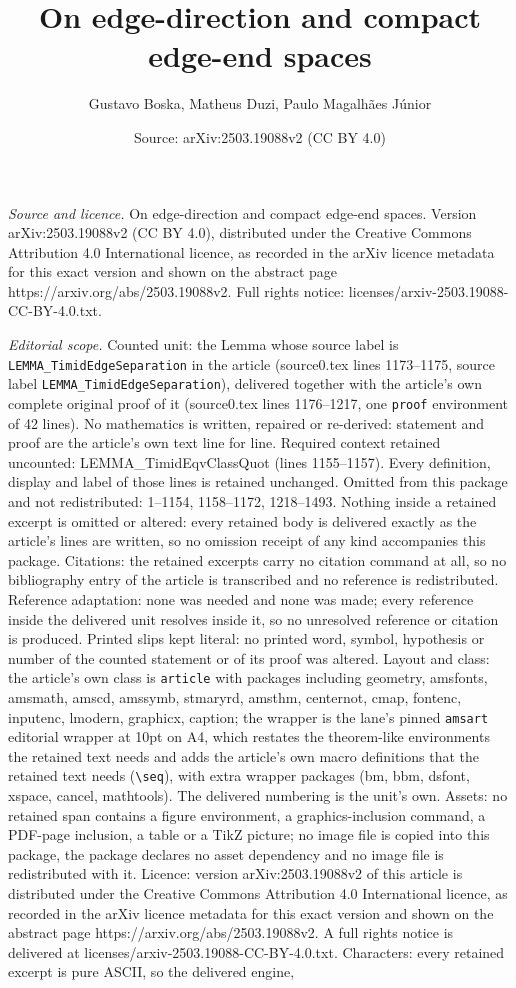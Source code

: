 \documentclass[10pt,a4paper]{amsart}
\title[On edge-direction and compact edge-end spaces]{On edge-direction and compact edge-end spaces}
\author{Gustavo Boska, Matheus Duzi, Paulo Magalh\~aes J\'unior}
\date{Source: arXiv:2503.19088v2 (CC BY 4.0)}
\begin{document}
\maketitle

\noindent\emph{Source and licence.} On edge-direction and compact edge-end spaces. Version arXiv:2503.19088v2 (CC BY 4.0), distributed under the Creative Commons Attribution 4.0 International licence, as recorded in the arXiv licence metadata for this exact version and shown on the abstract page https://arxiv.org/abs/2503.19088v2. Full rights notice: licenses/arxiv-2503.19088-CC-BY-4.0.txt.\par\smallskip

\noindent\textit{Editorial scope.} Counted unit: the Lemma whose source label is \texttt{LEMMA\_TimidEdgeSeparation} in the article (source0.tex lines 1173--1175, source label \texttt{LEMMA\_TimidEdgeSeparation}), delivered together with the article's own complete original proof of it (source0.tex lines 1176--1217, one \texttt{proof} environment of 42 lines). No mathematics is written, repaired or re-derived: statement and proof are the article's own text line for line. Required context retained uncounted: LEMMA\_TimidEqvClassQuot (lines 1155--1157). Every definition, display and label of those lines is retained unchanged. Omitted from this package and not redistributed: 1--1154, 1158--1172, 1218--1493. Nothing inside a retained excerpt is omitted or altered: every retained body is delivered exactly as the article's lines are written, so no omission receipt of any kind accompanies this package. Citations: the retained excerpts carry no citation command at all, so no bibliography entry of the article is transcribed and no reference is redistributed. Reference adaptation: none was needed and none was made; every reference inside the delivered unit resolves inside it, so no unresolved reference or citation is produced. Printed slips kept literal: no printed word, symbol, hypothesis or number of the counted statement or of its proof was altered. Layout and class: the article's own class is \texttt{article} with packages including geometry, amsfonts, amsmath, amscd, amssymb, stmaryrd, amsthm, centernot, cmap, fontenc, inputenc, lmodern, graphicx, caption; the wrapper is the lane's pinned \texttt{amsart} editorial wrapper at 10pt on A4, which restates the theorem-like environments the retained text needs and adds the article's own macro definitions that the retained text needs (\texttt{\textbackslash seq}), with extra wrapper packages (bm, bbm, dsfont, xspace, cancel, mathtools). The delivered numbering is the unit's own. Assets: no retained span contains a figure environment, a graphics-inclusion command, a PDF-page inclusion, a table or a TikZ picture; no image file is copied into this package, the package declares no asset dependency and no image file is redistributed with it. Licence: version arXiv:2503.19088v2 of this article is distributed under the Creative Commons Attribution 4.0 International licence, as recorded in the arXiv licence metadata for this exact version and shown on the abstract page https://arxiv.org/abs/2503.19088v2. A full rights notice is delivered at licenses/arxiv-2503.19088-CC-BY-4.0.txt. Characters: every retained excerpt is pure ASCII, so the delivered engine, 
\end{document}
